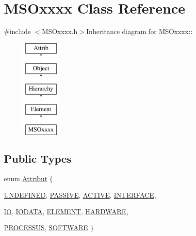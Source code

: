 \hypertarget{classMSOxxxx}{
\section{MSOxxxx Class Reference}
\label{classMSOxxxx}
}


{\ttfamily \#include $<$MSOxxxx.h$>$}Inheritance diagram for MSOxxxx::\begin{figure}[H]
\begin{center}
\leavevmode
\includegraphics[height=5cm]{classMSOxxxx}
\end{center}
\end{figure}
\subsection*{Public Types}
\begin{DoxyCompactItemize}
\item 
enum \hyperlink{classAttrib_a69e171d7cc6417835a5a306d3c764235}{Attribut} \{ \par
\hyperlink{classAttrib_a69e171d7cc6417835a5a306d3c764235a3a8da2ab97dda18aebab196fe4100531}{UNDEFINED}, 
\hyperlink{classAttrib_a69e171d7cc6417835a5a306d3c764235a2bfb2af57b87031d190a05fe25dd92ed}{PASSIVE}, 
\hyperlink{classAttrib_a69e171d7cc6417835a5a306d3c764235a3b1fec929c0370d1436f2f06e298fb0d}{ACTIVE}, 
\hyperlink{classAttrib_a69e171d7cc6417835a5a306d3c764235aa27c16b480a369ea4d18b07b2516bbc7}{INTERFACE}, 
\par
\hyperlink{classAttrib_a69e171d7cc6417835a5a306d3c764235a1420a5b8c0540b2af210b6975eded7f9}{IO}, 
\hyperlink{classAttrib_a69e171d7cc6417835a5a306d3c764235a0af3b0d0ac323c1704e6c69cf90add28}{IODATA}, 
\hyperlink{classAttrib_a69e171d7cc6417835a5a306d3c764235a7788bc5dd333fd8ce18562b269c9dab1}{ELEMENT}, 
\hyperlink{classAttrib_a69e171d7cc6417835a5a306d3c764235a61ceb22149f365f1780d18f9d1459423}{HARDWARE}, 
\par
\hyperlink{classAttrib_a69e171d7cc6417835a5a306d3c764235a75250e29692496e73effca2c0330977f}{PROCESSUS}, 
\hyperlink{classAttrib_a69e171d7cc6417835a5a306d3c764235a103a67cd0b8f07ef478fa45d4356e27b}{SOFTWARE}
 \}
\end{DoxyCompactItemize}
